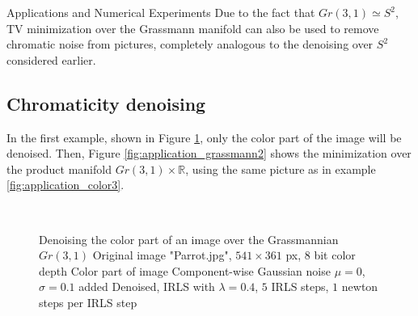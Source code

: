 \begin{chapter}{Applications and Numerical Experiments}
Due to the fact that $Gr(3,1)\simeq S^2$, TV minimization over the Grassmann manifold can also be used to remove
chromatic noise from pictures, completely analogous to the denoising over $S^2$ considered earlier. 

\subsection{Chromaticity denoising}
In the first example, shown in Figure \ref{fig:application_grassmann1}, only the color part of the image will be denoised. 
Then, Figure \ref{fig:application_grassmann2} shows the minimization over the product manifold $Gr(3,1)\times \mathbb{R}$, using the same picture as in example \ref{fig:application_color3}.

\begin{figure}[h!]
    \centering
    \\
    \caption[Color denoising]{Denoising the color part of an image over the Grassmannian $Gr(3,1)$
	 Original image "Parrot.jpg", $541\times 361$ px, 8 bit color depth
	 Color part of image
	 Component-wise Gaussian noise $\mu=0$, $\sigma=0.1$ added
	 Denoised, IRLS with $\lambda=0.4$, $5$ IRLS steps, $1$ newton steps per IRLS step
	\label{fig:application_grassmann1}
    }
\end{figure}


\end{chapter}
